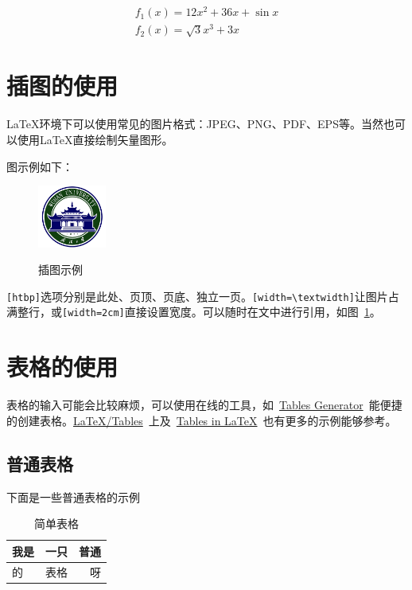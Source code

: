 \documentclass[]{WHUBachelor}
\begin{document}
  \begin{eqnarray}
    f_1(x)=12x^2+36x+\sin x\\
    f_2(x)=\sqrt{3}{x^3+3x}
  \end{eqnarray}
  
  \section{插图的使用}
  \LaTeX 环境下可以使用常见的图片格式：JPEG、PNG、PDF、EPS等。当然也可以使用\LaTeX 直接绘制矢量图形。

  图示例如下：
  \begin{figure}[!htb]
    \centering
    \includegraphics[width=0.2\textwidth]
    {figures/whulogo.png}\\
    \caption{插图示例}
    \label{fig:whu}
  \end{figure}

  \verb|[htbp]|选项分别是此处、页顶、页底、独立一页。\verb|[width=\textwidth]|让图片占满整行，或\verb|[width=2cm]|直接设置宽度。可以随时在文中进行引用，如图~\ref{fig:whu}。

  \section{表格的使用}
  表格的输入可能会比较麻烦，可以使用在线的工具，如~\href{https://www.tablesgenerator.com/}{Tables Generator}~能便捷的创建表格。\href{https://en.wikibooks.org/wiki/LaTeX/Tables}{LaTeX/Tables}~上及~\href{https://www.tug.org/pracjourn/2007-1/mori/mori.pdf}{Tables in LaTeX}~也有更多的示例能够参考。

  \subsection{普通表格}
  下面是一些普通表格的示例

  \begin{table}[ht]
    \centering
    \caption{简单表格}
    \label{tab:1}
    \begin{tabular}{|l|c|r|}
      \hline
      我是& 一只 & 普通\\
      \hline
      的& 表格& 呀\\
      \hline
    \end{tabular}
  \end{table}
  
\end{document}
